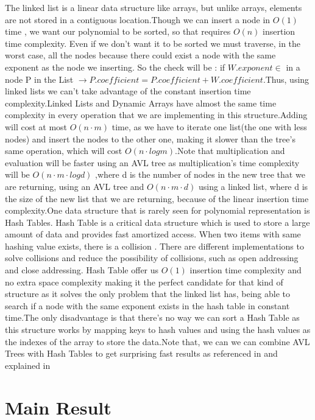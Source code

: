 \documentclass[journal,article,submit,moreauthors,algorithms]{Definitions/mdpi}
\begin{document}
The linked list is a linear data structure like arrays, but unlike arrays, elements are not stored in a contiguous location.Though we can insert a node in $O(1)$ time \cite{karimov}, we want our polynomial to be sorted, so that requires $O(n)$ insertion time complexity. Even if we don't want it to be sorted we must traverse, in the worst case, all the nodes because there could exist a node with the same exponent as the node we inserting. So the check will be :  if $W.exponent \in $ in a node P in the List  $\rightarrow P.coefficient = P.coefficient + W.coefficient$.Thus, using linked lists we can't take advantage of the constant insertion time complexity.Linked Lists and Dynamic Arrays have almost the same time complexity in every operation that we are implementing in this structure.Adding will cost at most $O(n \cdot m)$ time, as we have to iterate one list(the one with less nodes) and insert the nodes to the other one, making it slower than the tree's same operation, which will cost $O(n \cdot logm)$.Note that multiplication and evaluation will be faster using an AVL tree as multiplication's time complexity will be $O(n \cdot m \cdot logd)$ ,where d is the number of nodes in the new tree that we are returning, using an AVL tree and $O(n \cdot m \cdot d)$ using a linked list, where d is the size of the new list that we are returning, because of the linear insertion time complexity.One data structure that is rarely seen for polynomial representation is Hash Tables. Hash Table is a critical data structure which is used to store a large amount of data and provides fast amortized access. When two items with same hashing value exists, there is a collision \cite{liu}. There are different implementations to solve collisions and reduce the possibility of collisions, such as open addressing and close addressing. Hash Table offer us $O(1)$ insertion time complexity \cite{liu} and no extra space complexity making it the perfect candidate for that kind of structure as it solves the only problem that the linked list has, being able to search if a node with the same exponent exists in the hash table in constant time.The only disadvantage is that there's no way we can sort a Hash Table as this structure works by mapping keys to hash values and using the hash values as the indexes of the array to store the data.Note that, we can we can combine AVL Trees with Hash Tables to get surprising fast results as referenced in \cite{Maung} and explained in \cite{HashAVL}

\section{Main Result}
\end{document}
